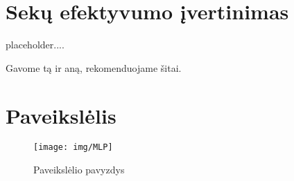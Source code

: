 \documentclass{VUMIFInfKursinis}
\begin{document}
\section{Sekų efektyvumo įvertinimas}
placeholder....



Gavome tą ir aną, rekomenduojame šitai.

\printbibliography[heading=bibintoc] %

\appendix  %

\section{Paveikslėlis}
\begin{figure}[H]
    \centering
    \texttt{[image: img/MLP]}
    \caption{Paveikslėlio pavyzdys}   %
    \label{img:mlp}
\end{figure}
\end{document}
